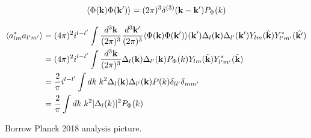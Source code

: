 \begin{align}
	\langle \Phi (\mathbf{k}) \Phi (\mathbf{k}') \rangle = (2\pi)^3 \delta^{(3)} (\mathbf{k} - \mathbf{k}') P_\Phi (k)
\end{align}


\begin{align}
	\langle a^*_{lm} a_{l'm'} \rangle &= (4\pi)^2 i^{l-l'} \int \frac{d^3\mathbf{k}}{(2\pi)^3} \frac{d^3\mathbf{k'}}{(2\pi)^3} \langle \Phi (\mathbf{k}) \Phi (\mathbf{k}') \rangle (\mathbf{k}') \Delta_l (\mathbf{k}) \Delta_{l'} (\mathbf{k'}) Y_{lm}(\hat{\mathbf{k}}) Y^*_{l'm'}(\hat{\mathbf{k}'})  \\
	&= (4\pi)^2 i^{l-l'} \int \frac{d^3\mathbf{k}}{(2\pi)^3} \Delta_l (\mathbf{k}) \Delta_{l'} (\mathbf{k}) P_\Phi(k) Y_{lm}(\hat{\mathbf{k}}) Y^*_{l'm'}(\hat{\mathbf{k}}) \\
	&= \frac{2}{\pi} i^{l-l'} \int dk \; k^2  \Delta_l (\mathbf{k}) \Delta_{l'} (\mathbf{k}) P(k) \delta_{ll'} \delta_{mm'} \\
	&= \frac{2}{\pi} \int dk \; k^2 |\Delta_l(k)|^2 P_\Phi (k)
\end{align}


Borrow Planck 2018 analysis picture. 
